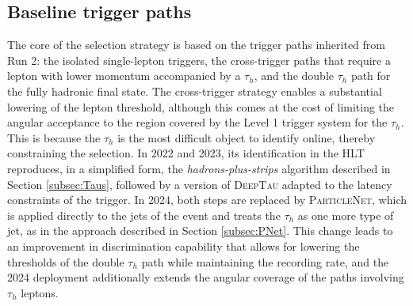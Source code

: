 \subsection{Baseline trigger paths}
%
The core of the selection strategy is based on the trigger paths inherited from Run 2: the isolated single-lepton triggers, the cross-trigger paths that require a lepton with lower momentum accompanied by a $\tau_h$, and the double $\tau_h$ path for the fully hadronic final state. The cross-trigger strategy enables a substantial lowering of the lepton threshold, although this comes at the cost of limiting the angular acceptance to the region covered by the Level 1 trigger system for the $\tau_h$. This is because the $\tau_h$ is the most difficult object to identify online, thereby constraining the selection. In 2022 and 2023, its identification in the HLT reproduces, in a simplified form, the \textit{hadrons-plus-strips} algorithm described in Section \ref{subsec:Taus}, followed by a version of \textsc{DeepTau} adapted to the latency constraints of the trigger. In 2024, both steps are replaced by \textsc{ParticleNet}, which is applied directly to the jets of the event and treats the $\tau_h$ as one more type of jet, as in the approach described in Section \ref{subsec:PNet}. This change leads to an improvement in discrimination capability that allows for lowering the thresholds of the double $\tau_h$ path while maintaining the recording rate, and the 2024 deployment additionally extends the angular coverage of the paths involving $\tau_h$ leptons.



